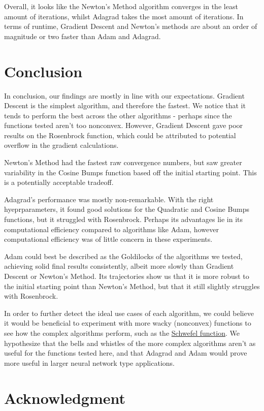 \documentclass[conference]{IEEEtran}
\begin{document}
Overall, it looks like the Newton's Method algorithm converges in the least amount of iterations,
whilst Adagrad takes the most amount of iterations. In terms of runtime,
Gradient Descent and Newton's methods are about an order of magnitude or two faster than Adam and Adagrad.

\section{Conclusion}
In conclusion, our findings are mostly in line with our expectations. Gradient Descent is the simplest algorithm,
and therefore the fastest. We notice that it tends to perform the best
across the other algorithms - perhaps since the functions tested aren't too nonconvex. However, Gradient Descent gave poor results on the Rosenbrock function, which could be attributed to
potential overflow in the gradient calculations. 

Newton's Method had the fastest raw convergence numbers, but saw greater variability in the
Cosine Bumps function based off the initial starting point. This is a potentially acceptable
tradeoff.

Adagrad's performance was mostly non-remarkable. With the right hyeprparameters, it found good solutions
for the Quadratic and Cosine Bumps functions, but it struggled with Rosenbrock. Perhaps its
advantages lie in its computational efficiency compared to algorithms like Adam, however computational
efficiency was of little concern in these experiments.

Adam could best be described as the Goldilocks of the algorithms we tested, achieving solid final results
consistently, albeit more slowly than Gradient Descent or Newton's Method. Its trajectories show us that
it is more robust to the initial starting point than Newton's Method, but that it still slightly struggles with
Rosenbrock.

In order to further detect the ideal use cases of each algorithm, we could believe it would be beneficial to
experiment with more wacky (nonconvex) functions to see how the complex algorithms perform,
such as the \href{https://www.sfu.ca/~ssurjano/schwef.html}{Schwefel function}. We hypothesize that the bells
and whistles of the more complex algorithms aren't as useful
for the functions tested here, and that Adagrad and Adam would prove more useful in larger neural network type applications.

\section*{Acknowledgment}
\end{document}
